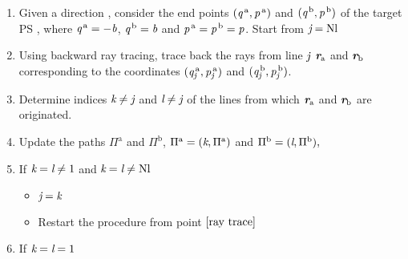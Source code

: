 \begin{enumerate}
\item Given a direction , consider the end points $(\textit{q}^{\,\textrm{a}}, \textit{p}^{\,\textrm{a}})$ and $(\textit{q}^{\,\textrm{b}}, \textit{p}^{\,\textrm{b}})$ of the target PS , where $\textit{q}^{\,\textrm{a}} = -\textit{b}$, $\textit{q}^{\,\textrm{b}} = \textit{b}$ and $\textit{p}^{\,\textrm{a}} = \textit{p}^{\,\textrm{b}} = \textit{p}$. Start from $\textit{j}=\textrm{Nl}$
\item \label{ray trace} Using backward ray tracing, trace back the rays from line $\textit{j}$ $\textit{\textbf{r}}_{\textrm{a}}$ and $\textit{\textbf{r}}_\textrm{b}$ corresponding to the coordinates  $(\textit{q}_{\textit{j}}^{\,\textrm{a}}, \textit{p}_{\textit{j}}^{\,\textrm{a}})$ and $ (\textit{q}_{\textit{j}}^{\,\textrm{b}}, \textit{p}_{\textit{j}}^{\,\textrm{b}})$. 
\item Determine indices $\textit{k}\neq\textit{j}$ and $\textit{l}\neq\textit{j}$ of the lines from which  $\textit{\textbf{r}}_{\textrm{a}}$ and $\textit{\textbf{r}}_{\textrm{b}}$ are originated.\\
\item Update the paths $\Pi^\textrm{a}$ and $\Pi^\textrm{b}$, $\Pi^\textrm{a} = (\textit{k}, \Pi^{\textrm{a}})$ and $\Pi^\textrm{b} = (\textit{l}, \Pi^\textrm{b}),$
\item If $\textit{k}=\textit{l} \neq 1$ and $\textit{k}=\textit{l} \neq \textrm{Nl}$
\begin{itemize}
\item $\textit{j}=\textit{k}$
\item Restart the procedure from point $\ref{ray trace}$
\end{itemize}
\item If $\textit{k}=\textit{l}= 1$ 
\begin{itemize}

\end{itemize}
\end{enumerate}
